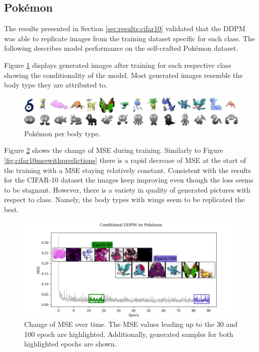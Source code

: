 \documentclass[12pt]{article}
\theoremstyle{plain}
\theoremstyle{definition}
\theoremstyle{remark}
\begin{document}
\subsection{Pokémon}\label{sec:pokémon}
The results presented in Section \ref{sec:results:cifar10} validated that the \ac{DDPM} was able to replicate images from the training dataset specific for each class. The following describes model performance on the self-crafted Pokémon dataset. 

Figure \ref{fig:pokemonperbodytype} displays generated images after training for each respective class showing the conditionality of the model. Most generated images resemble the body type they are attributed to. 

\begin{figure}[H]
	\centering
	\includegraphics[width=\linewidth]{src/Images/pokemon_per_body_type}
	\caption[Pokémon per body type]{Pokémon per body type.}
	\label{fig:pokemonperbodytype}
\end{figure}

Figure \ref{fig:pokemonmsewithpredictions} shows the change of \ac{MSE} during training. Similarly to Figure \ref{fig:cifar10msewithpredictions} there is a rapid decrease of \ac{MSE} at the start of the training with a \ac{MSE} staying relatively constant. Consistent with the results for the \ac{CIFAR-10} dataset the images keep improving even though the loss seems to be stagnant. However, there is a variety in quality of generated pictures with respect to class. Namely, the body types with wings seem to be replicated the best.

\begin{figure}[H]
	\centering
	\includegraphics[width=1.1\linewidth]{src/Images/pokemon_mse_with_predictions}
	\caption[Change of \ac{MSE} over time.]{Change of \ac{MSE} over time. The \ac{MSE} values leading up to the 30 and 100 epoch are highlighted. Additionally, generated samples for both highlighted epochs are shown.}
	\label{fig:pokemonmsewithpredictions}
\end{figure}
\end{document}
